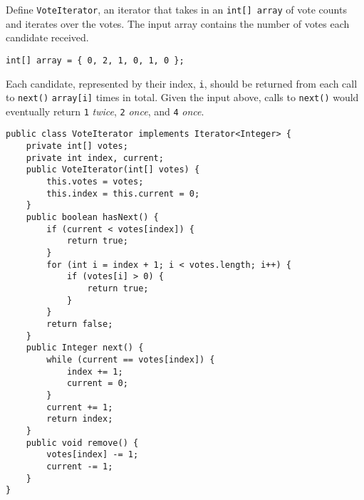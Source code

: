 \question Define \texttt{VoteIterator}, an iterator that takes in an \texttt{int[] array} of vote counts and iterates over the votes. The input array contains the number of votes each candidate received.

\begin{lstlisting}
int[] array = { 0, 2, 1, 0, 1, 0 };
\end{lstlisting}

Each candidate, represented by their index, \texttt{i}, should be returned from each call to \texttt{next()} \texttt{array[i]} times in total. Given the input above, calls to \texttt{next()} would eventually return \texttt{1} \textit{twice}, \texttt{2} \textit{once}, and \texttt{4} \textit{once}.

\begin{solution}[3in]
\begin{lstlisting}
public class VoteIterator implements Iterator<Integer> {
    private int[] votes;
    private int index, current;
    public VoteIterator(int[] votes) {
        this.votes = votes;
        this.index = this.current = 0;
    }
    public boolean hasNext() {
        if (current < votes[index]) {
            return true;
        }
        for (int i = index + 1; i < votes.length; i++) {
            if (votes[i] > 0) {
                return true;
            }
        }
        return false;
    }
    public Integer next() {
        while (current == votes[index]) {
            index += 1;
            current = 0;
        }
        current += 1;
        return index;
    }
    public void remove() {
        votes[index] -= 1;
        current -= 1;
    }
}
\end{lstlisting}
\end{solution}